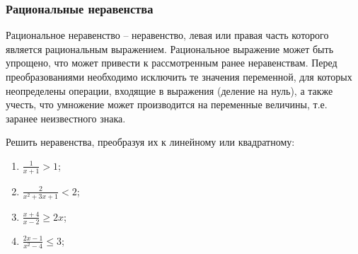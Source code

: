 \documentclass[algebra,twocolumn]{pum}
\date{21.04.20}
\begin{document}
\subsubsection*{Рациональные неравенства}
Рациональное неравенство -- неравенство, левая или правая часть которого является рациональным выражением. Рациональное выражение может быть упрощено, что может привести к рассмотренным ранее неравенствам. Перед преобразованиями необходимо исключить те значения переменной, для которых неопределены операции, входящие в выражения (деление на нуль), а также учесть, что умножение может производится на переменные величины, т.е. заранее неизвестного знака.

\begin{exercises}
  \begin{question}
    Решить неравенства, преобразуя их к линейному или квадратному:
    \begin{multicols}{2}
    \begin{enumerate}
      \item $\frac{1}{x+1}>1$;
      \item $\frac{2}{x^2+3x+1}<2$;
      \item $\frac{x+4}{x-2}\ge2x$;
      \item $\frac{2x-1}{x^2-4}\le3$;
    \end{enumerate}
  \end{multicols}
  \end{question}
\end{exercises}


\end{document}
